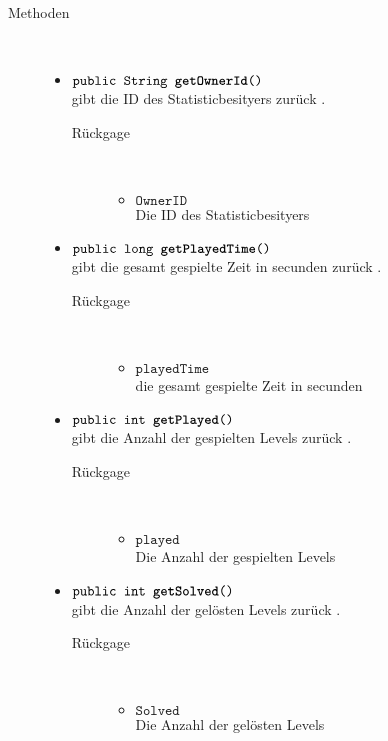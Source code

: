 \begin{description}
		\item[Methoden] \hfill \\
			\vspace{-.8cm}
			\begin{itemize}
			\item $\texttt{public  String \textbf{getOwnerId}()}$ \\ gibt die ID des Statisticbesityers zurück .
				\begin{description}
				\item[Rückgage] \hfill \\
					\vspace{-.8cm}
					\begin{itemize}
						\item $\texttt{OwnerID }$ \\Die ID des Statisticbesityers 					\end{itemize}	
					\end{description}
				\item $\texttt{public  long \textbf{getPlayedTime}()}$ \\ gibt die gesamt gespielte Zeit in secunden zurück .
				\begin{description}
				\item[Rückgage] \hfill \\
					\vspace{-.8cm}
					\begin{itemize}
						\item $\texttt{playedTime }$ \\die gesamt gespielte Zeit in secunden 
					\end{itemize}	
					\end{description}
					\item $\texttt{public  int \textbf{getPlayed}()}$ \\ gibt die Anzahl der gespielten Levels zurück .
				\begin{description}
				\item[Rückgage] \hfill \\
					\vspace{-.8cm}
					\begin{itemize}
						\item $\texttt{played }$ \\Die Anzahl der gespielten Levels
					\end{itemize}	
					\end{description}
					\item $\texttt{public  int \textbf{getSolved}()}$ \\ gibt die Anzahl der gelösten Levels zurück .
				\begin{description}
				\item[Rückgage] \hfill \\
					\vspace{-.8cm}
					\begin{itemize}
						\item $\texttt{Solved }$ \\Die Anzahl der gelösten Levels
					\end{itemize}	
					\end{description}
			

\end{itemize}
\end{description}
